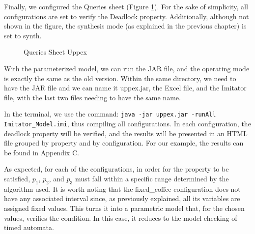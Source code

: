 Finally, we configured the Queries sheet (Figure \ref{fig:Q_CM}). For the sake of simplicity, all configurations are set to verify the Deadlock property. Additionally, although not shown in the figure, the synthesis mode (as explained in the previous chapter) is set to synth.

\begin{figure}[H]
    \centering
    \begin{minipage}{\textwidth}
        \centering
        \caption{Queries Sheet Uppex}
        \label{fig:Q_CM}
    \end{minipage}
\end{figure}


With the parameterized model, we can run the JAR file, and the operating mode is exactly the same as the old version. Within the same directory, we need to have the JAR file and we can name it uppex.jar, the Excel file, and the Imitator file, with the last two files needing to have the same name.

In the terminal, we use the command: \texttt{java -jar uppex.jar -runAll Imitator\_Model.imi}, thus compiling all configurations. In each configuration, the deadlock property will be verified, and the results will be presented in an HTML file grouped by property and by configuration. For our example, the results can be found in Appendix C.

As expected, for each of the configurations, in order for the property to be satisfied, $p_1$, $p_2$, and $p_3$ must fall within a specific range determined by the algorithm used. It is worth noting that the fixed\_coffee configuration does not have any associated interval since, as previously explained, all its variables are assigned fixed values. This turns it into a parametric model that, for the chosen values, verifies the condition. In this case, it reduces to the model checking of timed automata.


